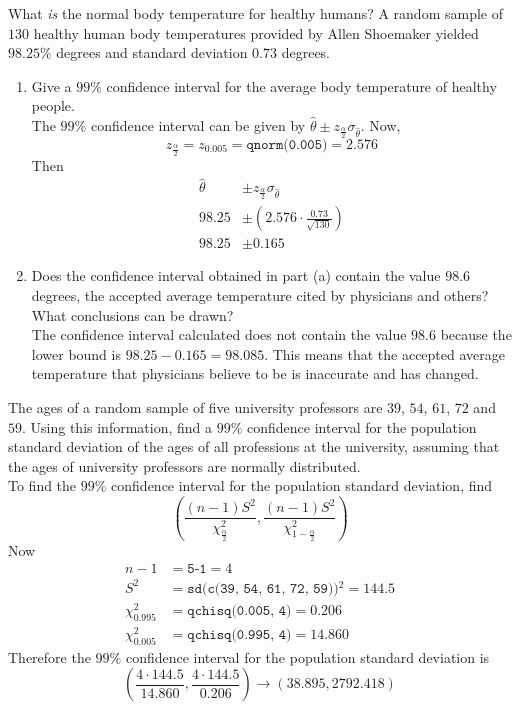 \documentclass[12pt]{article}
\newcommand{\ques}[1]{\noindent {\bf Question #1: }}
\begin{document}
\ques{8.60} What \textit{is} the normal body temperature for healthy humans? A random sample of $130$ healthy human body temperatures provided by Allen Shoemaker yielded $98.25\%$ degrees and standard deviation $0.73$ degrees.
\begin{enumerate} 
\item Give a $99\%$ confidence interval for the average body temperature of healthy people. \\ 
The $99\%$ confidence interval can be given by $\hat{\theta} \pm z_{\frac{\alpha}{2}}\sigma_{\hat{\theta}}$. Now, $$ z_{\frac{\alpha}{2}} = z_{0.005} = \texttt{qnorm(0.005)} = 2.576 $$
Then $$ \begin{aligned} \hat{\theta} &\pm z_{\frac{\alpha}{2}}\sigma_{\hat{\theta}} \\ 98.25 &\pm \left( 2.576 \cdot \frac{0.73}{\sqrt{130}}\right) \\ 98.25 &\pm 0.165 \end{aligned} $$

\item Does the confidence interval obtained in part (a) contain the value $98.6$ degrees, the accepted average temperature cited by physicians and others? What conclusions can be drawn? \\
The confidence interval calculated does not contain the value $98.6$ because the lower bound is $98.25 - 0.165 = 98.085$. This means that the accepted average temperature that physicians believe to be is inaccurate and has changed. 

\end{enumerate} 
\newpage

\ques{8.102} The ages of a random sample of five university professors are $39$, $54$, $61$, $72$ and $59$. Using this information, find a $99\%$ confidence interval for the population standard deviation of the ages of all professions at the university, assuming that the ages of university professors are normally distributed. \\
To find the $99\%$ confidence interval for the population standard deviation, find $$ \left( \frac{(n-1)S^2}{\chi^2_{\frac{\alpha}{2}}}, \frac{(n-1)S^2}{\chi^2_{1 - \frac{\alpha}{2}}}\right) $$ 
Now $$ \begin{aligned} n-1 &= \texttt{5-1} = 4 \\ S^2 &= \texttt{sd(c(39, 54, 61, 72, 59))$^2$} = 144.5 \\ \chi^2_{0.995} &= \texttt{qchisq(0.005, 4)} = 0.206 \\ \chi^2_{0.005} &= \texttt{qchisq(0.995, 4)} = 14.860 \end{aligned} $$ Therefore the $99\%$ confidence interval for the population standard deviation is 
$$ \left( \frac{4 \cdot 144.5}{14.860}, \frac{4 \cdot 144.5}{0.206} \right) \to (38.895, 2792.418) $$ 
\end{document}
